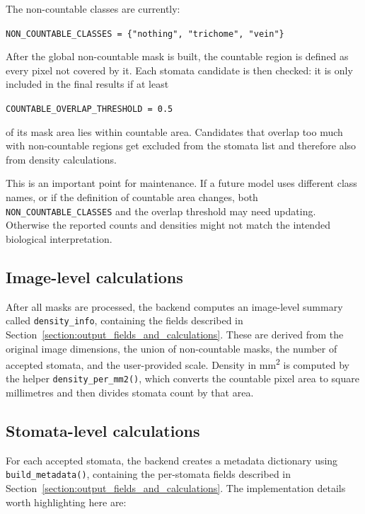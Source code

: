 \documentclass{article}
\begin{document}
The non-countable classes are currently:

\begin{center}
\texttt{NON\_COUNTABLE\_CLASSES = \{"nothing", "trichome", "vein"\}}
\end{center}

After the global non-countable mask is built, the countable region is defined as every pixel not covered by it. Each stomata candidate is then checked: it is only included in the final results if at least

\begin{center}
\texttt{COUNTABLE\_OVERLAP\_THRESHOLD = 0.5}
\end{center}

of its mask area lies within countable area. Candidates that overlap too much with non-countable regions get excluded from the stomata list and therefore also from density calculations.

This is an important point for maintenance. If a future model uses different class names, or if the definition of countable area changes, both \texttt{NON\_COUNTABLE\_CLASSES} and the overlap threshold may need updating. Otherwise the reported counts and densities might not match the intended biological interpretation.

\subsection{Image-level calculations}

After all masks are processed, the backend computes an image-level summary called \texttt{density\_info}, containing the fields described in Section~\ref{section:output_fields_and_calculations}. These are derived from the original image dimensions, the union of non-countable masks, the number of accepted stomata, and the user-provided scale. Density in mm\textsuperscript{2} is computed by the helper \texttt{density\_per\_mm2()}, which converts the countable pixel area to square millimetres and then divides stomata count by that area.

\subsection{Stomata-level calculations}

For each accepted stomata, the backend creates a metadata dictionary using \texttt{build\_metadata()}, containing the per-stomata fields described in Section~\ref{section:output_fields_and_calculations}. The implementation details worth highlighting here are:
\end{document}

